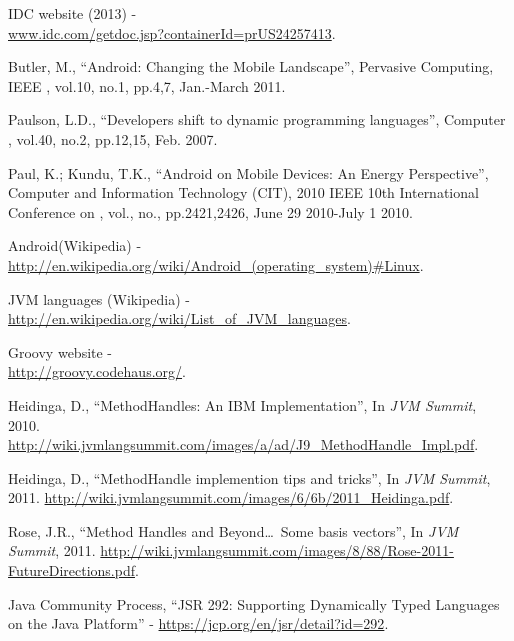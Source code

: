 \documentclass{sig-alternate}
\def \ANDROID{Android\xspace}
\def \JVM{JVM\xspace}
\begin{document}
\begin{thebibliography}{}

  IDC website (2013) - \\ \url{www.idc.com/getdoc.jsp?containerId=prUS24257413}.

  Butler, M., ``Android: Changing the Mobile Landscape'', Pervasive Computing, IEEE , vol.10, no.1, pp.4,7, Jan.-March 2011.

  Paulson, L.D., ``Developers shift to dynamic programming languages'', Computer , vol.40, no.2, pp.12,15, Feb. 2007.

  Paul, K.; Kundu, T.K., ``Android on Mobile Devices: An Energy Perspective'', Computer and Information Technology (CIT), 2010 IEEE 10th International Conference on , vol., no., pp.2421,2426, June 29 2010-July 1 2010.

  \ANDROID (Wikipedia) - \\ \url{http://en.wikipedia.org/wiki/Android\_(operating\_system)#Linux}.

  \JVM languages (Wikipedia) - \\ \url{http://en.wikipedia.org/wiki/List\_of\_JVM\_languages}.

  Groovy website - \\ \url{http://groovy.codehaus.org/}.
  
  Heidinga, D., ``MethodHandles: An IBM Implementation'', In {\it JVM Summit}, 2010. \url{http://wiki.jvmlangsummit.com/images/a/ad/J9_MethodHandle_Impl.pdf}.

  Heidinga, D., ``MethodHandle implemention tips and tricks'', In {\it JVM Summit}, 2011. \url{http://wiki.jvmlangsummit.com/images/6/6b/2011_Heidinga.pdf}.

  Rose, J.R., ``Method Handles and Beyond\dots~Some basis vectors'', In {\it JVM Summit}, 2011. \url{http://wiki.jvmlangsummit.com/images/8/88/Rose-2011-FutureDirections.pdf}.

  Java Community Process, ``JSR 292: Supporting Dynamically Typed Languages on the Java{\scriptsize\texttrademark} Platform'' - \url{https://jcp.org/en/jsr/detail?id=292}.


\end{thebibliography}
\end{document}
